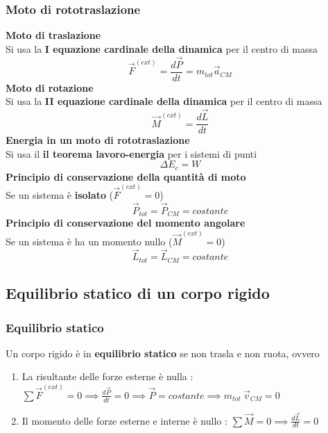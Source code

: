 \documentclass[twoside]{article}
\begin{document}
\subsubsection{Moto di rototraslazione}
\textbf{Moto di traslazione}\\
Si usa la \textbf{I equazione cardinale della dinamica} per il centro di massa
\begin{equation}
  \boxed{\vec{F}^{(ext)} = \frac{d\vec{P}}{dt} = m_{tot} \vec{a}_{CM}}
\end{equation}
\textbf{Moto di rotazione}\\
Si usa la \textbf{II equazione cardinale della dinamica} per il centro di massa
\begin{equation}
  \boxed{\vec{M}^{(ext)} = \frac{d\vec{L}}{dt}}
\end{equation}
\textbf{Energia in un moto di rototraslazione}\\
Si usa il \textbf{il teorema lavoro-energia} per i sistemi di punti
\begin{equation}
  \boxed{\Delta E_c = W}
\end{equation}
\textbf{Principio di conservazione della quantità di moto}\\
Se un sistema è \textbf{isolato} ($\vec{F}^{(ext)} = 0$)
\begin{equation}
  \boxed{\vec{P}_{tot} = \vec{P}_{CM} = costante}
\end{equation}
\textbf{Principio di conservazione del momento angolare}\\
Se un sistema è ha un momento nullo ($\vec{M}^{(ext)} = 0$)
\begin{equation}
  \boxed{\vec{L}_{tot} = \vec{L}_{CM} = costante}
\end{equation}
\subsection{Equilibrio statico di un corpo rigido}
\subsubsection{Equilibrio statico}
Un corpo rigido è in \textbf{equilibrio statico} se non trasla e non ruota, ovvero
\begin{enumerate}
  \item La risultante delle forze esterne è nulla : $\sum \vec{F}^{(ext)} = 0 \implies \frac{d\vec{P}}{dt} = 0 \implies \vec{P} = costante \implies m_{tot}\ \vec{v}_{CM} = 0 $
  \item Il momento delle forze esterne e interne è nullo : $\sum \vec{M} = 0 \implies \frac{d\vec{L}}{dt}=0$%
\end{enumerate}
\end{document}
